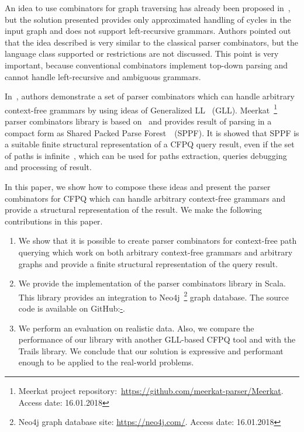 An idea to use combinators for graph traversing has already been proposed in~\cite{ScalaGraphParsing}, but the solution presented provides only approximated handling of cycles in the input graph and does not support left-recursive grammars. 
Authors pointed out that the idea described is very similar to the classical parser combinators, but the language class supported or restrictions are not discussed.
This point is very important, because conventional combinators implement top-down parsing and cannot handle left-recursive and ambiguous grammars.

In~\cite{Meerkat}, authors demonstrate a set of parser combinators which can handle arbitrary context-free grammars by using ideas of Generalized LL~\cite{scott2010gll} (GLL).
Meerkat~\footnote{Meerkat project repository:~\url{https://github.com/meerkat-parser/Meerkat}. Access date: 16.01.2018} parser combinators library is based on~\cite{Meerkat}
 and provides result of parsing in a compact form as Shared Packed Parse Forest~\cite{SPPF}~(SPPF).
It is showed that SPPF is a suitable finite structural representation of a CFPQ query result, even if the set of paths is infinite~\cite{GrigorevR16}, which can be used for paths extraction, queries debugging and processing of result.

In this paper, we show how to compose these ideas and present the parser combinators for CFPQ which can handle arbitrary context-free grammars and provide a structural representation of the result.
We make the following contributions in this paper.

\begin{enumerate}
\item We show that it is possible to create parser combinators for context-free path querying which work on both arbitrary context-free grammars and arbitrary graphs and provide a finite structural representation of the query result.
\item We provide the implementation of the parser combinators library in Scala. This library provides an integration to Neo4j~\footnote{Neo4j graph database site: \url{https://neo4j.com/}. Access date: 16.01.2018} graph database. The source code is available on GitHub:\url{-}.%
\item We perform an evaluation on realistic data. 
Also, we compare the performance of our library with another GLL-based CFPQ tool and with the Trails library.
We conclude that our solution is expressive and performant enough to be applied to the real-world problems. 
\end{enumerate}